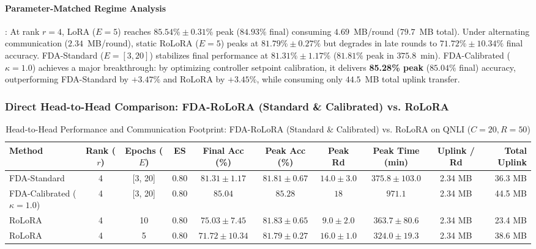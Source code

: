 \documentclass[10pt,a4paper]{article}
\begin{document}
\paragraph{Parameter-Matched Regime Analysis}:
At rank $r=4$, LoRA ($E=5$) reaches $85.54\% \pm 0.31\%$ peak ($84.93\%$ final) consuming $4.69$~MB/round ($79.7$~MB total). Under alternating communication ($2.34$~MB/round), static RoLoRA ($E=5$) peaks at $81.79\% \pm 0.27\%$ but degrades in late rounds to $71.72\% \pm 10.34\%$ final accuracy. FDA-Standard ($E=[3,20]$) stabilizes final performance at $81.31\% \pm 1.17\%$ ($81.81\%$ peak in $375.8$~min). FDA-Calibrated ($\kappa=1.0$) achieves a major breakthrough: by optimizing controller setpoint calibration, it delivers \textbf{85.28\% peak} ($85.04\%$ final) accuracy, outperforming FDA-Standard by $+3.47\%$ and RoLoRA by $+3.45\%$, while consuming only $44.5$~MB total uplink transfer.

\subsubsection*{Direct Head-to-Head Comparison: FDA-RoLoRA (Standard \& Calibrated) vs. RoLoRA}
\begin{table}[H]
\centering
\caption{Head-to-Head Performance and Communication Footprint: FDA-RoLoRA (Standard \& Calibrated) vs. RoLoRA on QNLI ($C=20, R=50$)}
\label{tab:direct_qnli_c20_r50}
\scriptsize
\setlength{\tabcolsep}{1.4pt}
\begin{tabular*}{\textwidth}{@{\extracolsep{\fill}}lccccccccr@{}}
\toprule
\textbf{Method} & \textbf{Rank ($r$)} & \textbf{Epochs ($E$)} & \textbf{ES} & \textbf{Final Acc (\%)} & \textbf{Peak Acc (\%)} & \textbf{Peak Rd} & \textbf{Peak Time (min)} & \textbf{Uplink / Rd} & \textbf{Total Uplink} \\
\midrule
    FDA-Standard & 4 & [3, 20] & 0.80 & $81.31 \pm 1.17$ & $81.81 \pm 0.67$ & $14.0 \pm 3.0$ & $375.8 \pm 103.0$ & 2.34 MB & 36.3 MB \\
    FDA-Calibrated ($\kappa=1.0$) & 4 & [3, 20] & 0.80 & $85.04$ & $85.28$ & $18$ & $971.1$ & 2.34 MB & 44.5 MB \\
    RoLoRA & 4 & 10 & 0.80 & $75.03 \pm 7.45$ & $81.83 \pm 0.65$ & $9.0 \pm 2.0$ & $363.7 \pm 80.6$ & 2.34 MB & 23.4 MB \\
    RoLoRA & 4 & 5 & 0.80 & $71.72 \pm 10.34$ & $81.79 \pm 0.27$ & $16.0 \pm 1.0$ & $324.0 \pm 19.3$ & 2.34 MB & 38.6 MB \\
\bottomrule
\end{tabular*}
\end{table}
\end{document}

